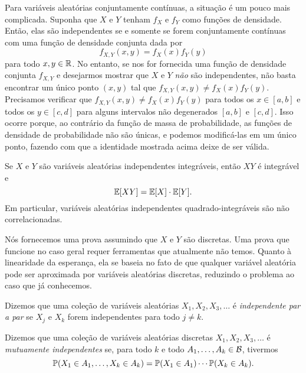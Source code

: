 Para variáveis aleatórias conjuntamente contínuas, a situação é um pouco mais complicada.
Suponha que $ X $ e $ Y $ tenham $ f_X $ e $ f_Y $ como funções de densidade.
Então, elas são independentes se e somente se forem conjuntamente contínuas com uma função de densidade conjunta dada por
\[
f_{X,Y}(x,y)
=
f_{X}(x)
f_{Y}(y)
\]
para todo $ x,y\in\mathbb{R} $.
No entanto, se nos for fornecida uma função de densidade conjunta $ f_{X,Y} $ e desejarmos mostrar que $ X $ e $ Y $ \emph{não} são independentes, não basta encontrar um único ponto $ (x,y) $ tal que
$ f_{X,Y}(x,y) \ne f_{X}(x)f_{Y}(y) $.
Precisamos verificar que $ f_{X,Y}(x,y) \ne f_{X}(x)f_{Y}(y) $ para todos os $ x \in [a,b] $ e todos os $ y \in [c,d] $ para alguns intervalos não degenerados $ [a,b] $ e $ [c,d] $.
Isso ocorre porque, ao contrário da função de massa de probabilidade, as funções de densidade de probabilidade não são únicas, e podemos modificá-las em um único ponto, fazendo com que a identidade mostrada acima deixe de ser válida.

\begin{theorem}
Se $ X $ e $ Y $ são variáveis aleatórias independentes integráveis, então $ XY $ é integrável e
\[
\mathbb{E}[XY] = \mathbb{E}[X] \cdot \mathbb{E}[Y].
\]
Em particular, variáveis aleatórias independentes quadrado-integráveis são não correlacionadas.
\end{theorem}

Nós fornecemos uma prova assumindo que $ X $ e $ Y $ são discretas.
Uma prova que funcione no caso geral requer ferramentas que atualmente não temos.
Quanto à linearidade da esperança, ela se baseia no fato de que qualquer variável aleatória pode ser aproximada por variáveis aleatórias discretas, reduzindo o problema ao caso que já conhecemos.

\begin{definition}
Dizemos que uma coleção de variáveis aleatórias $ X_1, X_2, X_3, \dots $ é \emph{independente par a par} se $ X_j $ e $ X_k $ forem independentes para todo $ j \neq k $.
\end{definition}

\begin{definition}
Dizemos que uma coleção de variáveis aleatórias discretas $ X_1, X_2, X_3, \dots $ é \emph{mutuamente independentes} se, para todo $ k $ e todo $ A_1, \dots, A_k \in \mathcal B $, tivermos
\[
\mathbb{P}(X_1\in A_1,\dots,X_k\in A_k)
=
\mathbb{P}(X_1\in A_1)
\cdots
\mathbb{P}(X_k\in A_k)
.
\]
\end{definition}

